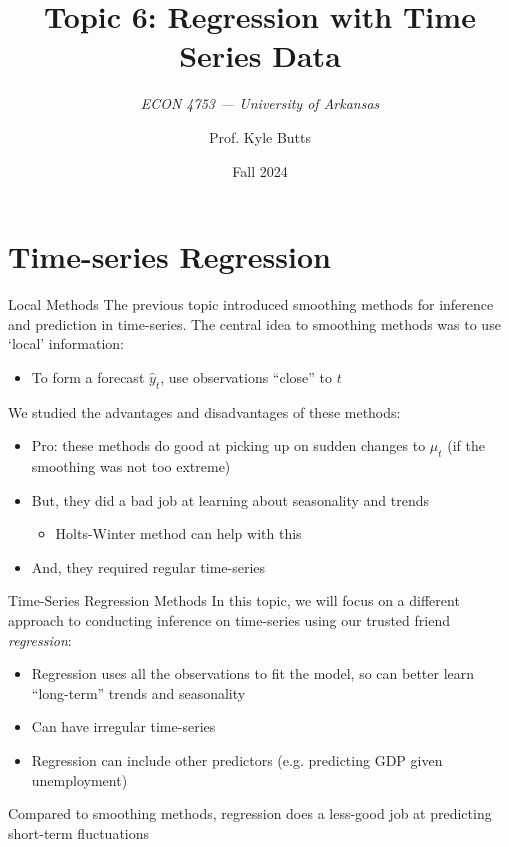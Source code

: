 \documentclass[aspectratio=169,t,11pt,table]{beamer}
\title{Topic 6: Regression with Time Series Data}
\subtitle{\it  ECON 4753 — University of Arkansas}
\date{Fall 2024}
\author{Prof. Kyle Butts}
\begin{document}
\begin{frame}
\maketitle

\end{frame}

\section{Time-series Regression}

\begin{frame}{Local Methods}
  The previous topic introduced smoothing methods for inference and prediction in time-series. The central idea to smoothing methods was to use `local' information:
  \begin{itemize}
    \item To form a forecast $\hat{y}_t$, use observations ``close'' to $t$
  \end{itemize}

  \bigskip
  We studied the advantages and disadvantages of these methods: 
  \begin{itemize}
    \item Pro: these methods do good at picking up on sudden changes to $\mu_t$ (if the smoothing was not too extreme)

    \item But, they did a bad job at learning about seasonality and trends
    \begin{itemize}
      \item Holts-Winter method can help with this
    \end{itemize}

    \item And, they required \alert{regular time-series}
  \end{itemize}
\end{frame}

\begin{frame}{Time-Series Regression Methods}
  In this topic, we will focus on a different approach to conducting inference on time-series using our trusted friend \emph{regression}: 
  \begin{itemize}
    \item Regression uses all the observations to fit the model, so can better learn ``long-term'' trends and seasonality
    
    \item Can have irregular time-series
    
    \item Regression can include other predictors (e.g. predicting GDP given unemployment)
  \end{itemize}

  \bigskip
  Compared to smoothing methods, regression does a less-good job at predicting short-term fluctuations 
\end{frame}
\end{document}
